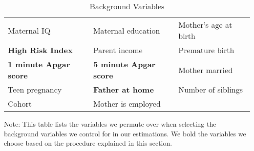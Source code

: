 \begin{table}[H]
\centering
\begin{threeparttable}
\caption{Background Variables}
\label{tab:pselectvars}
\begin{tabular}{C{5cm} C{5cm} C{5cm}}
\toprule
Maternal IQ			& Maternal education		& Mother's age at birth \\
\textbf{High Risk Index}		& Parent income			& Premature birth \\
\textbf{1 minute Apgar score}	& \textbf{5 minute Apgar score}	& Mother married \\
Teen pregnancy		& \textbf{Father at home}			& Number of siblings \\
Cohort 				& Mother is employed		& \\
\bottomrule
\end{tabular}
\begin{tablenotes}
\footnotesize
\item Note: This table lists the variables we permute over when selecting the background variables we control for in our estimations. We bold the variables we choose based on the procedure explained in this section.
\end{tablenotes}
\end{threeparttable}
\end{table}